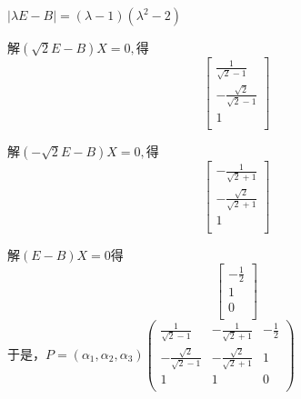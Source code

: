 \documentclass[lang=cn,10pt]{elegantbook}
\begin{document}
\begin{solution}
	$|\lambda E-B|=(\lambda-1)(\lambda^{2}-2)$
	
	解$(\sqrt{2}E-B)X=0,$得
	\begin{equation*}
		\left[ \begin{array}{c}
			\frac{1}{\sqrt{2}-1}\\
			-\frac{\sqrt{2}}{\sqrt{2}-1}\\
			1\\
		\end{array} \right] 
	\end{equation*}
	
	解$(-\sqrt{2}E-B)X=0,$得
	\begin{equation*}
		\left[ \begin{array}{c}
			-\frac{1}{\sqrt{2}+1}\\
			-\frac{\sqrt{2}}{\sqrt{2}+1}\\
			1\\
		\end{array} \right] 
	\end{equation*}
	
	解$(E-B)X=0$得
	\begin{equation*}
		\left[ \begin{array}{c}
			-\frac{1}{2}\\
			1\\
			0\\
		\end{array} \right] 
	\end{equation*}
	于是，$P=\left( \alpha _1,\alpha _2,\alpha _3 \right)\left( \begin{matrix}
		\frac{1}{\sqrt{2}-1}&		-\frac{1}{\sqrt{2}+1}&		-\frac{1}{2}\\
		-\frac{\sqrt{2}}{\sqrt{2}-1}&		-\frac{\sqrt{2}}{\sqrt{2}+1}&		1\\
		1&		1&		0\\
	\end{matrix} \right) $


\end{solution}
\end{document}
